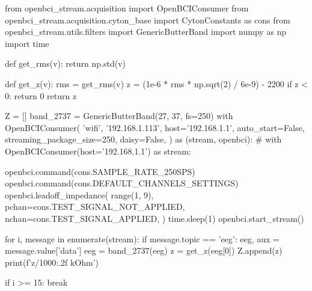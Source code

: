 \begin{python}
from openbci_stream.acquisition import OpenBCIConsumer
from openbci_stream.acquisition.cyton_base import CytonConstants as cons
from openbci_stream.utils.filters import GenericButterBand
import numpy as np
import time

def get_rms(v):
    return np.std(v)

def get_z(v):
    rms = get_rms(v)
    z = (1e-6 * rms * np.sqrt(2) / 6e-9) - 2200
    if z < 0:
        return 0
    return z

Z = []
band_2737 = GenericButterBand(27, 37, fs=250)
with OpenBCIConsumer(
    'wifi',
    '192.168.1.113',
    host='192.168.1.1',
    auto_start=False,
    streaming_package_size=250,
    daisy=False,
) as (stream, openbci):
    # with OpenBCIConsumer(host='192.168.1.1') as stream:

    openbci.command(cons.SAMPLE_RATE_250SPS)
    openbci.command(cons.DEFAULT_CHANNELS_SETTINGS)
    openbci.leadoff_impedance(
        range(1, 9),
        pchan=cons.TEST_SIGNAL_NOT_APPLIED,
        nchan=cons.TEST_SIGNAL_APPLIED,
    )
    time.sleep(1)
    openbci.start_stream()

    for i, message in enumerate(stream):
        if message.topic == 'eeg':
            eeg, aux = message.value['data']
            eeg = band_2737(eeg)
            z = get_z(eeg[0])
            Z.append(z)
            print(f'{z/1000:.2f} kOhm')

        if i >= 15:
            break
\end{python}
